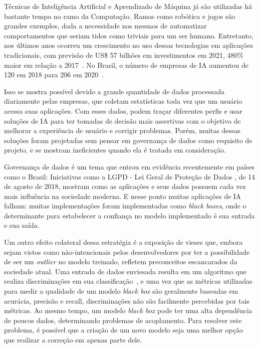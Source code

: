 \documentclass[portugues]{ic-tese}
\begin{document}
Técnicas de Inteligência Artificial e Aprendizado de Máquina já são utilizadas há bastante tempo no ramo da Computação. Ramos como robótica e jogos são grandes exemplos, dada a necessidade nos mesmos de automatizar comportamentos que seriam tidos como triviais para um ser humano. Entretanto, nos últimos anos ocorreu um crescimento no uso dessas tecnologias em aplicações tradicionais, com previsão de US\$ 57 bilhões em investimentos em 2021, 480\% maior em relação a 2017~\citep{Deloitte_2018}. No Brasil, o número de empresas de IA aumentou de 120 em 2018 para 206 em 2020~\citep{CIO_2021}.

Isso se mostra possível devido a grande quantidade de dados processada diariamente pelas empresas, que coletam estatísticas toda vez que um usuário acessa suas aplicações. Com esses dados, podem traçar diferentes perfis e usar soluções de IA para ter tomadas de decisão mais assertivas com o objetivo de melhorar a experiência de usuário e corrigir problemas. Porém, muitas dessas soluções foram projetadas sem pensar em governança de dados como requisito de projeto, e se mostram ineficientes quando ela é tratada em consideração.

Governança de dados é um tema que entrou em evidência recentemente em países como o Brasil: Iniciativas como a LGPD - Lei Geral de Proteção de Dados \citep{LGPD_2021}, de 14 de agosto de 2018, mostram como as aplicações e seus dados possuem cada vez mais influência na sociedade moderna. E nesse ponto muitas aplicações de IA falham: muitas implementações foram implementadas como \textit{black boxes}, onde o determinante para estabelecer a confiança no modelo implementado é sua entrada e sua saída.

Um outro efeito colateral dessa estratégia é a exposição de vieses que, embora sejam vistos como não-intencionais pelos desenvolvedores por ter a possibilidade de ser um \textit{outlier} no modelo treinado, refletem preconceitos escancarados da sociedade atual. Uma entrada de dados enviesada resulta em um algoritmo que realiza discriminações em sua classificação~\citep{Buolamwini_2018}, e uma vez que as métricas utilizadas para medir a qualidade de um modelo \textit{black box} são geralmente baseadas em acurácia, precisão e recall, discriminações não são facilmente percebidas por tais métricas. Ao mesmo tempo, um modelo \textit{black box} pode ter uma alta dependência de poucos dados, determinando problemas de acoplamento. Para resolver este problema, é possível que a criação de um novo modelo seja uma melhor opção que realizar a correção em apenas parte dele.
\end{document}
